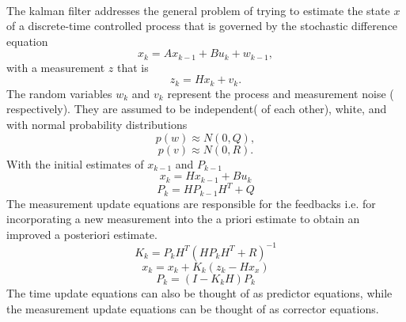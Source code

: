 \documentclass[a4paper,10pt]{report}
\begin{document}
\paragraph*{}
The kalman filter addresses the general problem of trying to estimate the state $x$ of a discrete-time controlled process that is
governed by the stochastic difference equation
\begin{equation}
 x_k = Ax_{k-1} + Bu_k + w_{k-1} ,
\end{equation}
with a measurement $z$ that is
\begin{equation}
 z_k = Hx_k + v_k.
\end{equation}
The random variables $w_k$ and $v_k$ represent the process and measurement noise ( respectively). They are assumed to be independent( of each other), white, and with normal probability distributions
\begin{equation}
 p(w) \approx N(0,Q),
\end{equation}
\begin{equation}
 p(v) \approx N(0,R).
\end{equation}
With the initial estimates of $x_{k-1}$ and $P_{k-1}$
\begin{equation}
x_k = Hx_{k-1} + Bu_k
\end{equation}
\begin{equation}
P_k = HP_{k-1}H^T + Q
\end{equation}
The measurement update equations are responsible for the feedbacks i.e. for incorporating a new measurement into the a priori estimate
to obtain an improved a posteriori estimate.
\begin{equation}
K_k = P_kH^T(HP_kH^T + R)^{-1} \label{kalmangain}
\end{equation}
\begin{equation}
x_k = x_k + K_k(z_k - Hx_x)
\end{equation}
\begin{equation}
P_k = (I-K_kH)P_k
\end{equation}
The time update equations can also be thought of as predictor equations, while the measurement update equations can be thought of as corrector equations.
\end{document}
